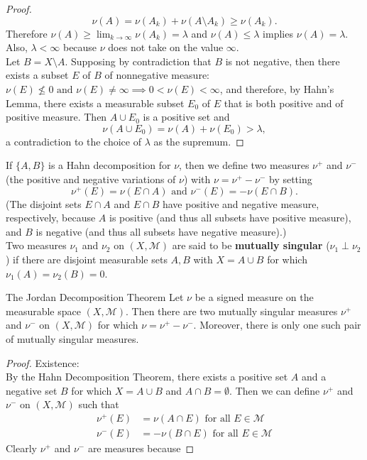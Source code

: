 \begin{flushleft}
\begin{proof}
		\[
			\nu(A)=\nu(A_k)+\nu(A\setminus A_k)\ge\nu(A_k).
		\]
		Therefore $\nu(A)\ge\lim_{k\to\infty}\nu(A_k)=\lambda$ and $\nu(A)\le\lambda$ implies $\nu(A)=\lambda$.
		Also, $\lambda<\infty$ because $\nu$ does not take on the value $\infty$.
		\\Let $B=X\setminus A$.
		Supposing by contradiction that $B$ is not negative, then there exists a subset $E$ of $B$ of nonnegative measure: $\nu(E)\not\le0\text{ and }\nu(E)\neq\infty\implies 0<\nu(E)<\infty$, and therefore, by Hahn's Lemma, there exists a measurable subset $E_0$ of $E$ that is both positive and of positive measure.
		Then $A\cup E_0$ is a positive set and 
		\[
			\nu(A\cup E_0)=\nu(A)+\nu(E_0)>\lambda,
		\]
		a contradiction to the choice of $\lambda$ as the supremum.
	\end{proof}
	If $\{A,B\}$ is a Hahn decomposition for $\nu$, then we define two measures $\nu^+$ and $\nu^-$ (the positive and negative variations of $\nu$) with $\nu=\nu^+-\nu^-$ by setting
	\[
		\nu^+(E)=\nu(E\cap A)\text{ and }\nu^-(E)=-\nu(E\cap B).	
	\]
	(The disjoint sets $E\cap A$ and $E\cap B$ have positive and negative measure, respectively, because $A$ is positive (and thus all subsets have positive measure), and $B$ is negative (and thus all subsets have negative measure).) 
	\\\bigskip Two measures $\nu_1$ and $\nu_2$ on $(X,\mathcal{M})$ are said to be \textbf{mutually singular} ($\nu_1\perp\nu_2$) if there are disjoint measurable sets $A,B$ with $X=A\cup B$ for which $\nu_1(A)=\nu_2(B)=0$.
	\begin{namedthm*}{The Jordan Decomposition Theorem}
		Let $\nu$ be a signed measure on the measurable space $(X,\mathcal{M})$. 
		Then there are two mutually singular measures $\nu^+$ and $\nu^-$ on $(X,\mathcal{M})$ for which $\nu=\nu^+-\nu^-$.
		Moreover, there is only one such pair of mutually singular measures.
	\end{namedthm*}
	\begin{proof}
		Existence:
		\\By the Hahn Decomposition Theorem, there exists a positive set $A$ and a negative set $B$ for which $X=A\cup B$ and $A\cap B=\emptyset$.
		Then we can define $\nu^+$ and $\nu^-$ on $(X,\mathcal{M})$ such that
		\begin{align*}
			\nu^+(E)&=\nu(A\cap E)\text{ for all }E\in\mathcal{M}\\
			\nu^-(E)&=-\nu(B\cap E)\text{ for all }E\in\mathcal{M}
		\end{align*}
		Clearly  $\nu^+$ and $\nu^-$ are measures because 

\end{proof}
\end{flushleft}

